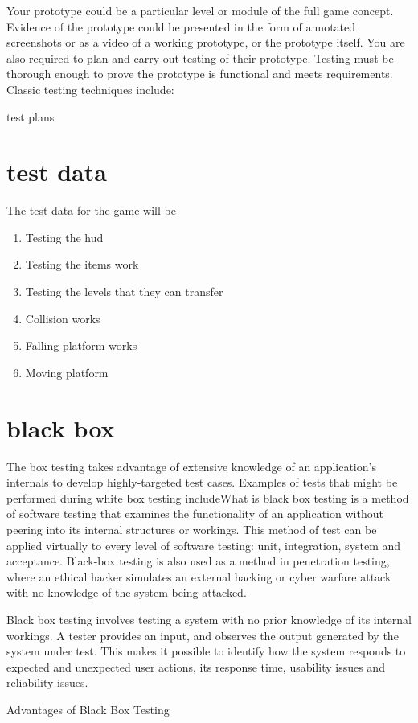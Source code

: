 \documentclass{article}
\begin{document}
Your prototype could be a particular level or module of the full game concept. Evidence of the
prototype could be presented in the form of annotated screenshots or as a video of a working
prototype, or the prototype itself.
You are also required to plan and carry out testing of their prototype. Testing must be thorough
enough to prove the prototype is functional and meets requirements. Classic testing techniques
include:

test plans
\section{test data}
The test data for the game will be    
\begin{enumerate}
	\item Testing the hud
	\item Testing the items work
	\item Testing the levels that they can transfer
	\item Collision works
	\item Falling platform works
	\item Moving platform
\end{enumerate}

\section{black box}
The box testing takes advantage of extensive knowledge of an application’s internals to develop highly-targeted test cases. Examples of tests that might be performed during white box testing includeWhat is black box testing is a method of software testing that examines the functionality of an application without peering into its internal structures or workings. This method of test can be applied virtually to every level of software testing: unit, integration, system and acceptance. Black-box testing is also used as a method in penetration testing, where an ethical hacker simulates an external hacking or cyber warfare attack with no knowledge of the system being attacked. 

Black box testing involves testing a system with no prior knowledge of its internal workings. A tester provides an input, and observes the output generated by the system under test. This makes it possible to identify how the system responds to expected and unexpected user actions, its response time, usability issues and reliability issues.

Advantages of Black Box Testing
\end{document}
